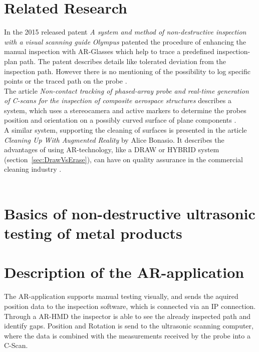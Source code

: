 \documentclass{VRARWorkshop}
\begin{document}
\section{Related Research}
In the 2015 released patent \textit{A system and method of non-destructive inspection with a visual scanning guide} \textit{Olympus} patented the procedure of enhancing the manual inspection with AR-Glasses which help to trace a predefined inspection-plan path.
The patent describes details like tolerated deviation from the inspection path.
However there is no mentioning of the possibility to log specific points or the traced path on the probe \cite{ARPat15}.\\

The article \textit{Non-contact tracking of phased-array probe and real-time generation of C-scans for the inspection of composite aerospace structures} describes a system, which uses a stereocamera and active markers to determine the probes position and orientation on a possibly curved surface of plane components \cite{walter_non-contact_2007}.\\

A similar system, supporting the cleaning of surfaces is presented in the article \textit{Cleaning Up With Augmented Reality} by Alice Bonasio.
It describes the advantages of using AR-technology, like a DRAW or HYBRID system (section~\ref{sec:DrawVsErase}), can have on quality assurance in the commercial cleaning industry \cite{ARClean}.\\

\cite{fadzil_design_2015}\\

\section{Basics of non-destructive ultrasonic testing of metal products}
\cite{deutsch_zfp_2010}
\cite{moles_introduction_2004}
\cite{olympus_Grundlagen}

\section{Description of the AR-application}
The AR-application supports manual testing visually, and sends the aquired position data to the inspection software, which is connected via an IP connection.
Through a AR-HMD the inspector is able to see the already inspected path and identify gaps.
Position and Rotation is send to the ultrasonic scanning computer, where the data is combined with the measurements received by the probe into a C-Scan.
\end{document}
